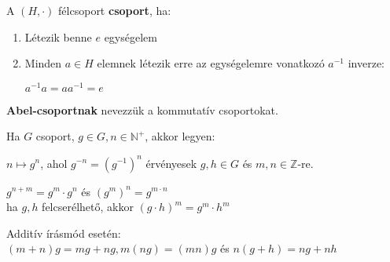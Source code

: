 \begin{frame}
  \begin{tcolorbox}[title={Def.: Csoport, Abel-csoport}]
    A $(H, {\cdot})$ félcsoport \textbf{csoport}, ha:
    \begin{enumerate}
      \item Létezik benne $e$ egységelem
      \item Minden $a \in H$ elemnek létezik erre az egységelemre vonatkozó $a^{-1}$ inverze:\\
      \msmallskip
      
      $a^{-1}a = aa^{-1} = e$
    \end{enumerate}
    \mmedskip

    \textbf{Abel-csoportnak} nevezzük a kommutatív csoportokat.
  \end{tcolorbox}

  \begin{tcolorbox}[title={Def.: $n$ tényezős szorzat / Hatványozás egész kitevővel}]
    Ha $G$ csoport, $g \in G, n \in \mathbb{N}^+$, akkor legyen:\\
    \msmallskip
    
    $n \mapsto g^n$, ahol $g^{-n} = (g^{-1})^n$ érvényesek $g, h \in G$ és $m, n \in \mathbb{Z}$-re.\\
    \msmallskip

    $g^{n + m} = g^m \cdot g^n$ és $(g^m)^n = g^{m \cdot n}$\\
    ha $g, h$ felcserélhető, akkor $(g \cdot h)^m = g^m \cdot h^m$\\
    \msmallskip

    Additív írásmód esetén:\\
    $(m + n)g = mg + ng, m(ng) = (mn)g$ és $n(g + h) = ng + nh$
  \end{tcolorbox}
\end{frame}



